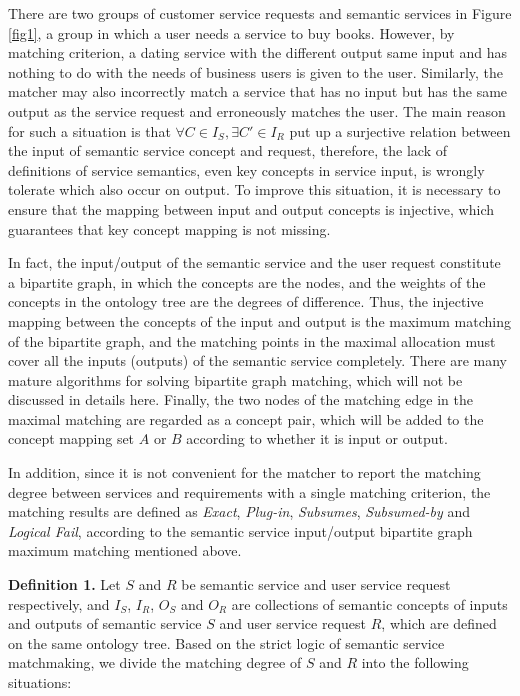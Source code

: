 \documentclass{ieeeaccess}
\begin{document}
There are two groups of customer service requests and semantic services in Figure \ref{fig1}, a group in which a user needs a service to buy books. However, by matching criterion, a dating service with the different output same input and has nothing to do with the needs of business users is given to the user. Similarly, the matcher may also incorrectly match a service that has no input but has the same output as the service request and erroneously matches the user. The main reason for such a situation is that $\forall C\in I_{S}, \exists {C}'\in I_{R}$ put up a surjective relation between the input of semantic service concept and request, therefore, the lack of definitions of service semantics, even key concepts in service input, is wrongly tolerate which also occur on output. To improve this situation, it is necessary to ensure that the mapping between input and output concepts is injective, which guarantees that key concept mapping is not missing.

In fact, the input/output of the semantic service and the user request constitute a bipartite graph, in which the concepts are the nodes, and the weights of the concepts in the ontology tree are the degrees of difference. Thus, the injective mapping between the concepts of the input and output is the maximum matching of the bipartite graph, and the matching points in the maximal allocation must cover all the inputs (outputs) of the semantic service completely. There are many mature algorithms for solving bipartite graph matching, which will not be discussed in details here. Finally, the two nodes of the matching edge in the maximal matching are regarded as a concept pair, which will be added to the concept mapping set $A$ or $B$ according to whether it is input or output.

In addition, since it is not convenient for the matcher to report the matching degree between services and requirements with a single matching criterion, the matching results are defined as \textit{Exact}, \textit{Plug-in}, \textit{Subsumes}, \textit{Subsumed-by} and \textit{Logical Fail}, according to the semantic service input/output bipartite graph maximum matching mentioned above.

\textbf{Definition 1.} Let $S$ and $R$ be semantic service and user service request respectively, and  $I_{S}$, $I_{R}$, $O_{S}$ and $O_{R}$ are collections of semantic concepts of inputs and outputs of semantic service $S$ and user service request $R$, which are defined on the same ontology tree. Based on the strict logic of semantic service matchmaking, we divide the matching degree of $S$ and $R$ into the following situations:
\end{document}
